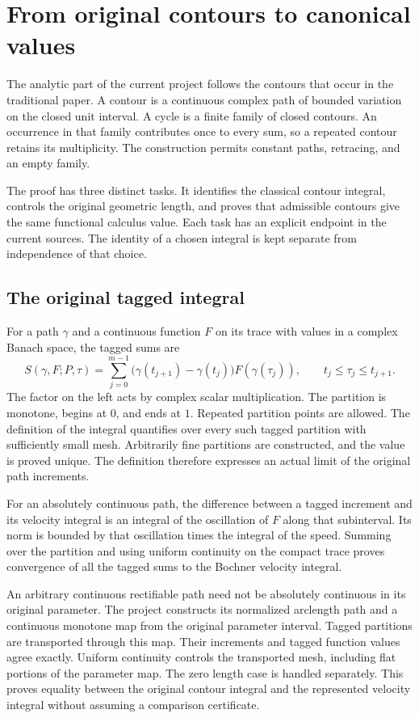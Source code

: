 \section{From original contours to canonical values}\label{sec:analytic-closeout}

The analytic part of the current project follows the contours that occur in the traditional paper. A contour is a continuous complex path of bounded variation on the closed unit interval. A cycle is a finite family of closed contours. An occurrence in that family contributes once to every sum, so a repeated contour retains its multiplicity. The construction permits constant paths, retracing, and an empty family.

The proof has three distinct tasks. It identifies the classical contour integral, controls the original geometric length, and proves that admissible contours give the same functional calculus value. Each task has an explicit endpoint in the current sources. The identity of a chosen integral is kept separate from independence of that choice.

\subsection{The original tagged integral}

For a path $\gamma$ and a continuous function $F$ on its trace with values in a complex Banach space, the tagged sums are
\[
 S(\gamma,F;P,\tau)
 =\sum_{j=0}^{m-1}
   \bigl(\gamma(t_{j+1})-\gamma(t_j)\bigr)F(\gamma(\tau_j)),
 \qquad t_j\leq\tau_j\leq t_{j+1}.
\]
The factor on the left acts by complex scalar multiplication. The partition is monotone, begins at $0$, and ends at $1$. Repeated partition points are allowed. The definition of the integral quantifies over every such tagged partition with sufficiently small mesh. Arbitrarily fine partitions are constructed, and the value is proved unique. The definition therefore expresses an actual limit of the original path increments.

For an absolutely continuous path, the difference between a tagged increment and its velocity integral is an integral of the oscillation of $F$ along that subinterval. Its norm is bounded by that oscillation times the integral of the speed. Summing over the partition and using uniform continuity on the compact trace proves convergence of all the tagged sums to the Bochner velocity integral.

An arbitrary continuous rectifiable path need not be absolutely continuous in its original parameter. The project constructs its normalized arclength path and a continuous monotone map from the original parameter interval. Tagged partitions are transported through this map. Their increments and tagged function values agree exactly. Uniform continuity controls the transported mesh, including flat portions of the parameter map. The zero length case is handled separately. This proves equality between the original contour integral and the represented velocity integral without assuming a comparison certificate.

